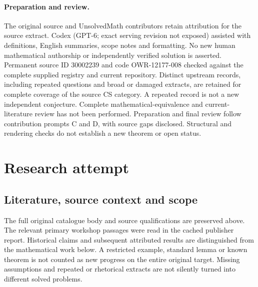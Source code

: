 \documentclass[11pt]{article}
\begin{document}
\paragraph{Preparation and review.}
The original source and UnsolvedMath contributors retain attribution for the source extract. Codex (GPT-6; exact serving revision not exposed) assisted with definitions, English summaries, scope notes and formatting. No new human mathematical authorship or independently verified solution is asserted. Permanent source ID 30002239 and code OWR-12177-008 checked against the complete supplied registry and current repository. Distinct upstream records, including repeated questions and broad or damaged extracts, are retained for complete coverage of the source CS category. A repeated record is not a new independent conjecture. Complete mathematical-equivalence and current-literature review has not been performed. Preparation and final review follow contribution prompts C and D, with source gaps disclosed. Structural and rendering checks do not establish a new theorem or open status.
\label{end:30002239}

\section{Research attempt}
\subsection{Literature, source context and scope}
The full original catalogue body and source qualifications are preserved above. The relevant primary workshop passages were read in the cached publisher report. Historical claims and subsequent attributed results are distinguished from the mathematical work below. A restricted example, standard lemma or known theorem is not counted as new progress on the entire original target. Missing assumptions and repeated or rhetorical extracts are not silently turned into different solved problems.
\end{document}
